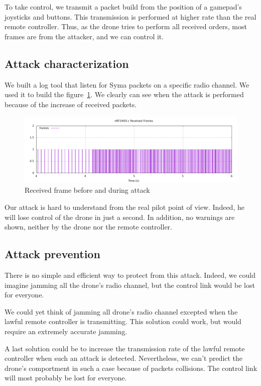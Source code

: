 \documentclass[conference,a4paper]{IEEEtran}
\begin{document}
To take control, we transmit a packet build from the position of a gamepad's joysticks and
buttons. This transmission is performed at higher rate than the real remote controller.
Thus, as the drone tries to perform all received orders, most frames are from the
attacker, and we can control it.

\subsection{Attack characterization}
We built a log tool that listen for Syma packets on a specific radio channel. We used it
to build the figure~\ref{fig:syma}. We clearly can see when the attack is performed
because of the increase of received packets.

\begin{figure}[!hb]
  \centering
  \includegraphics[width=\linewidth]{../Rapport/img/gnuplot-trames-emises.png}
  \caption{Received frame before and during attack}%
  \label{fig:syma}
\end{figure}

Our attack is hard to understand from the real pilot point of view. Indeed, he will lose
control of the drone in just a second. In addition, no warnings are shown, neither by the
drone nor the remote controller.

\subsection{Attack prevention}
There is no simple and efficient way to protect from this attack. Indeed, we could imagine
jamming all the drone's radio channel, but the control link would be lost for
everyone.

We could yet think of jamming all drone's radio channel excepted when the lawful remote
controller is transmitting. This solution could work, but would require an extremely
accurate jamming.

A last solution could be to increase the transmission rate of the lawful remote controller
when such an attack is detected. Nevertheless, we can't predict the drone's comportment
in such a case because of packets collisions. The control link will most probably be lost
for everyone.
\end{document}
